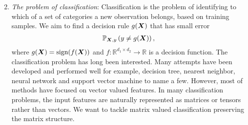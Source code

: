\documentclass[12pt]{article}
\begin{document}
\begin{enumerate}[label={2.\arabic*}]
\setcounter{enumi}{1}
\item {\it The problem of classification}: Classification is the problem of identifying to which of a set of categories a new observation belongs, based on training samples. We aim to find a decision rule $g(\bm X)$ that has small error
\begin{align}
    \mathbb{P}_{\bm X,y}\left(y\neq g(\bm X)\right),
\end{align}
where $g(\bm X) = \text{sign}(f(\bm X))$ and $f:\mathbb{R}^{d_1\times d_2}\rightarrow \mathbb{R}$ is a decision function. The classification problem has long been interested. Many attempts have been developed and performed well for example, decision tree, nearest neighbor, neural network and support vector machine to name a few. However, most of methods have focused on vector valued features. In many classification problems, the input features are naturally represented as matrices or tensors rather than vectors. 
We want to tackle matrix valued classification preserving the matrix structure.



\end{enumerate}
\end{document}
